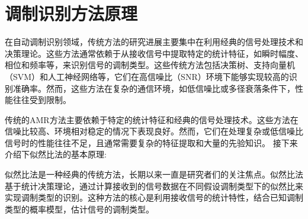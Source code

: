 





\section{调制识别方法原理}\label{sec:background}

在自动调制识别领域，传统方法的研究进展主要集中在利用经典的信号处理技术和决策理论。这些方法通常依赖于从接收信号中提取特定的统计特征，如瞬时幅度、相位和频率等，来识别信号的调制类型。这些传统方法包括决策树、支持向量机（SVM）和人工神经网络等，它们在高信噪比（SNR）环境下能够实现较高的识别准确率。然而，这些方法在复杂的通信环境，如低信噪比或多径衰落条件下，性能往往受到限制。

传统的AMR方法主要依赖于特定的统计特征和经典的信号处理技术。这些方法在信噪比较高、环境相对稳定的情况下表现良好。然而，它们在处理复杂或低信噪比信号时的性能往往不足，且通常需要复杂的特征提取和大量的先验知识。
接下来介绍下似然比法的基本原理:

似然比法是一种经典的传统方法，长期以来一直是研究者们的关注焦点。似然比法基于统计决策理论，通过计算接收到的信号数据在不同假设调制类型下的似然比来实现调制类型的识别。这种方法的核心是利用接收信号的统计特性，结合已知调制类型的概率模型，估计信号的调制类型。

